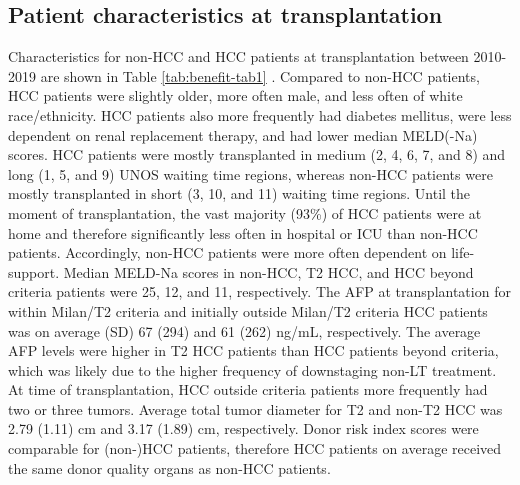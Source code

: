 \documentclass[11pt,english,]{book} %
\begin{document}
\hypertarget{patient-characteristics-at-transplantation}{%
\subsection*{Patient characteristics at transplantation}\label{patient-characteristics-at-transplantation}}

Characteristics for non-HCC and HCC patients at transplantation between 2010-2019 are shown in Table \ref{tab:benefit-tab1} . Compared to non-HCC patients, HCC patients were slightly older, more often male, and less often of white race/ethnicity. HCC patients also more frequently had diabetes mellitus, were less dependent on renal replacement therapy, and had lower median MELD(-Na) scores. HCC patients were mostly transplanted in medium (2, 4, 6, 7, and 8) and long (1, 5, and 9) UNOS waiting time regions, whereas non-HCC patients were mostly transplanted in short (3, 10, and 11) waiting time regions. Until the moment of transplantation, the vast majority (93\%) of HCC patients were at home and therefore significantly less often in hospital or ICU than non-HCC patients. Accordingly, non-HCC patients were more often dependent on life-support. Median MELD-Na scores in non-HCC, T2 HCC, and HCC beyond criteria patients were 25, 12, and 11, respectively.
The AFP at transplantation for within Milan/T2 criteria and initially outside Milan/T2 criteria HCC patients was on average (SD) 67 (294) and 61 (262) ng/mL, respectively. The average AFP levels were higher in T2 HCC patients than HCC patients beyond criteria, which was likely due to the higher frequency of downstaging non-LT treatment. At time of transplantation, HCC outside criteria patients more frequently had two or three tumors. Average total tumor diameter for T2 and non-T2 HCC was 2.79 (1.11) cm and 3.17 (1.89) cm, respectively.
Donor risk index scores were comparable for (non-)HCC patients, therefore HCC patients on average received the same donor quality organs as non-HCC patients.

\linespread{1}
\small
\end{document}
